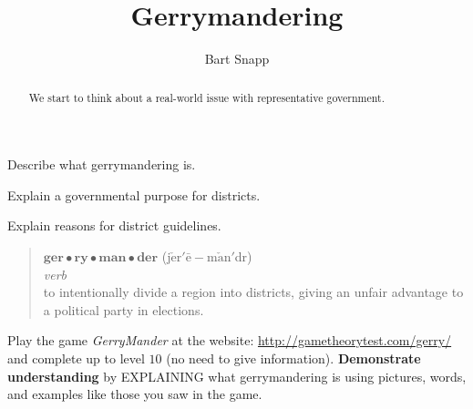 \documentclass[noauthor,nooutcomes,hints,handout]{ximera}
\title{Gerrymandering}
\author{Bart Snapp}
\begin{document}
\begin{abstract}
  We start to think about a real-world issue with representative government.
\end{abstract}
\maketitle

\begin{listOutcomes}
\item Describe what gerrymandering is.
\item Explain a governmental purpose for districts.
\item Explain reasons for district guidelines.
\end{listOutcomes}
\begin{mdframed}[style=OutcomeStyle]
\begin{quote}
  $\textbf{ger}\bullet\textbf{ry}\bullet\textbf{man}\bullet\textbf{der}$ (j$\check{\text{e}}$r$'\bar{\text{e}}-$m$\check{\text{a}}$n$'$d{}r)
  \\
  
  \textit{verb}\\

  
\quad to intentionally divide a region into districts, giving an
unfair advantage to a political party in elections.
\end{quote}
\end{mdframed}




\mynewpage






\begin{question}
  Play the game \textsl{GerryMander} at the website:
  \url{http://gametheorytest.com/gerry/} and complete up to level $10$
  (no need to give information).  \textbf{Demonstrate understanding}
  by EXPLAINING what gerrymandering is using pictures, words, and
  examples like those you saw in the game.
  
\end{question}


\mynewpage
\end{document}

